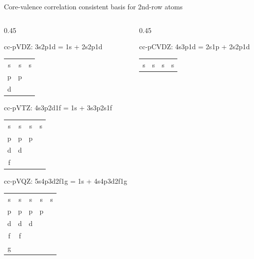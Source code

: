 \documentclass[aspectratio=169,9pt]{beamer}
\newcommand{\red}[1]{\textcolor{hfRed}{#1}}
\newcommand{\green}[1]{\textcolor{hfGreen}{#1}}
\begin{document}
\begin{frame}{Core-valence correlation consistent basis for 2nd-row atoms}
\small
	\begin{columns}
		\begin{column}{0.45\textwidth}
        	\begin{block}{cc-p\green{V}DZ: \small 3s2p1d = \red{1s} + \green{2s2p1d}}
        		\begin{tabular}{ccc}
        			\red{s} & \green{s} & \green{s} \\
        			\green{p} & \green{p} \\
        			\green{d} \\
        		\end{tabular}
        	\end{block}
        	\begin{block}{cc-p\green{V}TZ: \small 4s3p2d1f = \red{1s} + \green{3s3p2s1f}}
        		\begin{tabular}{cccc}
        			\red{s} & \green{s} & \green{s} & \green{s} \\
        			\green{p} & \green{p} & \green{p} \\
        			\green{d} & \green{d} \\
        			\green{f}  \\
        		\end{tabular}
        	\end{block}
        	\begin{block}{cc-p\green{V}QZ: \small 5s4p3d2f1g = \red{1s} + \green{4s4p3d2f1g}}
        		\begin{tabular}{ccccc}
        			\red{s} & \green{s} & \green{s} & \green{s} & \green{s} \\
        			\green{p} & \green{p} & \green{p} & \green{p} \\
        			\green{d} & \green{d} & \green{d} \\
        			\green{f} & \green{f} \\
        			\green{g} \\
        		\end{tabular}
        	\end{block}
		\end{column}
		\begin{column}{0.45\textwidth}
        	\begin{block}{cc-p\red{C}\green{V}DZ: \small 4s3p1d = \red{2s1p} + \green{2s2p1d}}
        		\begin{tabular}{cccc}
        			\red{s} & \red{s} & \green{s} & \green{s} \\

\end{tabular}
\end{block}
\end{column}
\end{columns}
\end{frame}
\end{document}
